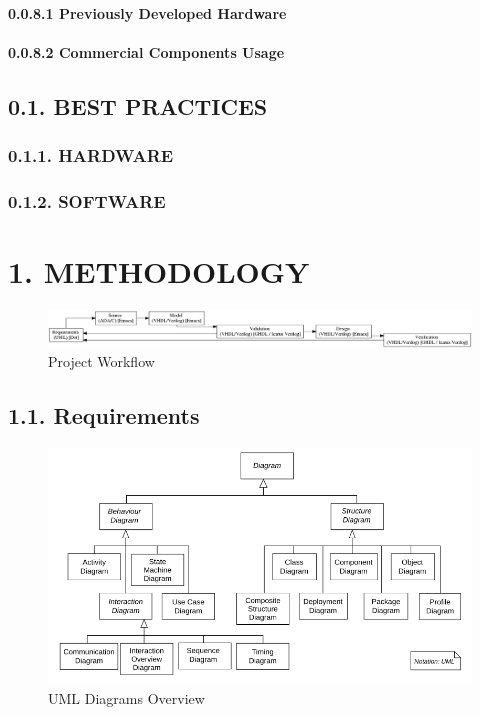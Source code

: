 \documentclass[]{article}
\let\oldparagraph\paragraph
\renewcommand{\paragraph}[1]{\oldparagraph{#1}\mbox{}}
\begin{document}
\paragraph{0.0.8.1 Previously Developed
Hardware}\label{previously-developed-hardware}

\paragraph{0.0.8.2 Commercial Components
Usage}\label{commercial-components-usage}

\subsection{0.1. BEST PRACTICES}\label{best-practices}

\subsubsection{0.1.1. HARDWARE}\label{hardware}

\subsubsection{0.1.2. SOFTWARE}\label{software}

\section{1. METHODOLOGY}\label{methodology}

\begin{figure}
\centering
\includegraphics{../doc/project.png}
\caption{Project Workflow}
\end{figure}

\subsection{1.1. Requirements}\label{requirements}

\begin{figure}
\centering
\includegraphics{../doc/graphviz/uml_diagrams_overview.png}
\caption{UML Diagrams Overview}
\end{figure}
\end{document}
